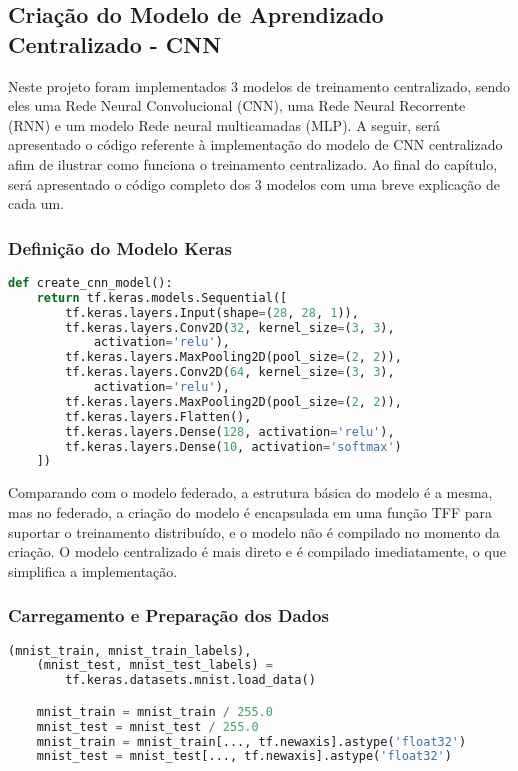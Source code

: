 \subsection{Criação do Modelo de Aprendizado Centralizado - CNN}

Neste projeto foram implementados 3 modelos de treinamento centralizado, sendo eles uma Rede Neural Convolucional (CNN), uma Rede Neural Recorrente (RNN) e um modelo Rede neural multicamadas (MLP). A seguir, será apresentado o código referente à implementação do modelo de CNN centralizado afim de ilustrar como funciona o treinamento centralizado. Ao final do capítulo, será apresentado o código completo dos 3 modelos com uma breve explicação de cada um.

\subsubsection{Definição do Modelo Keras}

\begin{lstlisting}[language=Python, caption={Definição do modelo Keras centralizado}, label={lst:centralized_keras_model}]
    def create_cnn_model():
    return tf.keras.models.Sequential([
        tf.keras.layers.Input(shape=(28, 28, 1)),
        tf.keras.layers.Conv2D(32, kernel_size=(3, 3), 
            activation='relu'),
        tf.keras.layers.MaxPooling2D(pool_size=(2, 2)),
        tf.keras.layers.Conv2D(64, kernel_size=(3, 3), 
            activation='relu'),
        tf.keras.layers.MaxPooling2D(pool_size=(2, 2)),
        tf.keras.layers.Flatten(),
        tf.keras.layers.Dense(128, activation='relu'),
        tf.keras.layers.Dense(10, activation='softmax')
    ])
\end{lstlisting}

Comparando com o modelo federado, a estrutura básica do modelo é a mesma, mas no federado, a criação do modelo é encapsulada em uma função TFF para suportar o treinamento distribuído, e o modelo não é compilado no momento da criação. O modelo centralizado é mais direto e é compilado imediatamente, o que simplifica a implementação.

\subsubsection{Carregamento e Preparação dos Dados}

\begin{lstlisting}[language=Python, caption={Carregamento e preparação dos dados centralizados}, label={lst:centralized_data}]
    (mnist_train, mnist_train_labels), 
    (mnist_test, mnist_test_labels) = 
        tf.keras.datasets.mnist.load_data()

    mnist_train = mnist_train / 255.0
    mnist_test = mnist_test / 255.0
    mnist_train = mnist_train[..., tf.newaxis].astype('float32')
    mnist_test = mnist_test[..., tf.newaxis].astype('float32')
\end{lstlisting}

